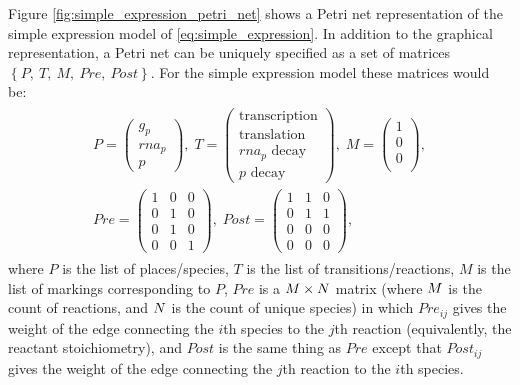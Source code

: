 Figure \ref{fig:simple_expression_petri_net} shows a Petri net representation of the simple expression model of \eqref{eq:simple_expression}. In addition to the graphical representation, a Petri net can be uniquely specified as a set of matrices $\left\{P,\ T,\ M,\ Pre,\ Post \right\}$\cite{Wilkinson:2012tt}. For the simple expression model these matrices would be:
\begin{gather}\label{eq:simple_expression_matrices}
\begin{split}
    P = \left( \begin{array}{c}
        g_p \\
        rna_p \\
        p
    \end{array} \right),\;
%
    T = \left( \begin{array}{c}
        \textrm{transcription} \\
        \textrm{translation} \\
        rna_p \textrm{ decay} \\
        p \textrm{ decay}
    \end{array} \right),\;
%
    M = \left( \begin{array}{c}
        1 \\
        0 \\
        0 \\
    \end{array} \right),\\
%
Pre = \left( \begin{array}{ccc}
        1 & 0 & 0 \\
        0 & 1 & 0 \\
        0 & 1 & 0 \\
        0 & 0 & 1   
\end{array} \right),\;
%
    Post = \left( \begin{array}{ccc}
        1 & 1 & 0 \\
        0 & 1 & 1 \\
        0 & 0 & 0 \\
        0 & 0 & 0
    \end{array} \right),\;
\end{split}
\end{gather}
where $P$ is the list of places/species, $T$ is the list of transitions/reactions, $M$ is the list of markings corresponding to $P$, $Pre$ is a $M \times N$ matrix (where $M$ is the count of reactions, and $N$ is the count of unique species) in which $Pre_{ij}$ gives the weight of the edge connecting the $i$th species to the $j$th reaction (equivalently, the reactant stoichiometry), and $Post$ is the same thing as $Pre$ except that $Post_{ij}$ gives the weight of the edge connecting the $j$th reaction to the $i$th species.

